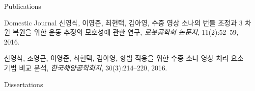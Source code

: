 \begin{rSection}{Publications}
\begin{pubSubsection}{Domestic Journal}
	신영식, 이영준, 최현택, 김아영,
	수중 영상 소나의 번들 조정과 3 차원 복원을 위한 운동 추정의 모호성에 관한 연구,
	\textit{로봇공학회 논문지}, 11(2):52--59, 2016.

	신영식, 조영근, 이영준, 최현택, 김아영,
	항법 적용을 위한 수중 소나 영상 처리 요소 기법 비교 분석,
	\textit{한국해양공학회지}, 30(3):214--220, 2016.
\end{pubSubsection}




\begin{pubSubsection}{Dissertations}
  \item {}
  \item {}
\end{pubSubsection}


\end{rSection}
